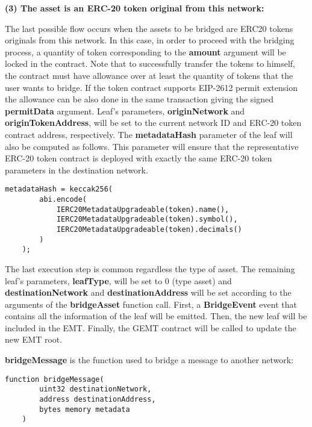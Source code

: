\textbf{(3) The asset is an ERC-20 token original from this network:}

The last possible flow occurs when the assets to be bridged are ERC20 tokens originals from this network. In this case, in order to proceed with the bridging process, a quantity of token corresponding to the \textbf{amount} argument will be locked in the contract. Note that to successfully transfer the tokens to himself, the contract must have allowance over at least the quantity of tokens that the user wants to bridge. If the token contract supports EIP-2612 permit extension the allowance can be also done in the same transaction giving the signed \textbf{permitData} argument. Leaf's parameters, \textbf{originNetwork} and \textbf{originTokenAddress}, will be set to the current network ID and ERC-20 token contract address, respectively. The \textbf{metadataHash} parameter of the leaf will also be computed as follows. This parameter will ensure that the representative ERC-20 token contract is deployed with exactly the same ERC-20 token parameters in the destination network.

\begin{lstlisting}[language=Solidity]
	 metadataHash = keccak256(
	 	abi.encode(
			IERC20MetadataUpgradeable(token).name(),
			IERC20MetadataUpgradeable(token).symbol(),
			IERC20MetadataUpgradeable(token).decimals()
		)
	);
\end{lstlisting}



The last execution step is common regardless the type of asset.
The remaining leaf's parameters, \textbf{leafType}, will be set to 0 (type asset) and \textbf{destinationNetwork} and \textbf{destinationAddress} will be set according to the arguments of the \textbf{bridgeAsset} function call. First, a \textbf{BridgeEvent} event that contains all the information of the leaf will be emitted. Then, the new leaf will be included in the EMT. Finally, the GEMT contract will be called to update the new EMT root.

\vspace{0.5cm}

\textbf{bridgeMessage} is the function used to bridge a message to another network:

\begin{lstlisting}[language=solidity]
	function bridgeMessage(
        uint32 destinationNetwork,
        address destinationAddress,
        bytes memory metadata
    )
\end{lstlisting}

